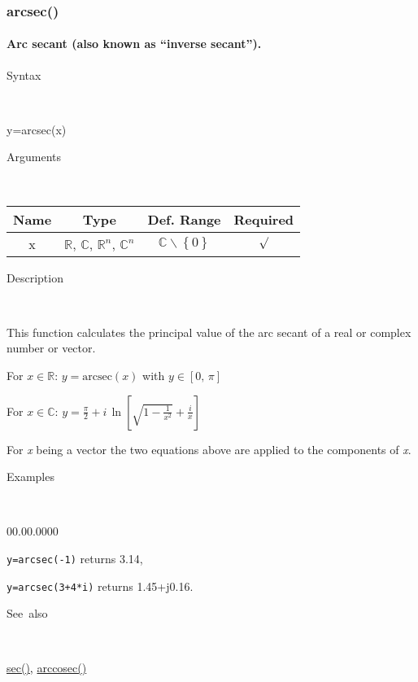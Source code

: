 \newpage
\subsubsection*{\hypertarget{arcsec}{}{\Large arcsec()}}


\paragraph{\label{par:Arc-sec}Arc secant (also known as {}``inverse secant'').}

\begin{description}
\item [Syntax]~
\end{description}
y=arcsec(x)

\begin{description}
\item [Arguments]~
\end{description}
\begin{tabular}{|c|c|c|c|}
\hline 
Name&
Type&
Def. Range&
Required\tabularnewline
\hline
\hline 
x&
$\mathbb{R}$, $\mathbb{C}$, $\mathbb{R}^{n}$, $\mathbb{C}^{n}$&
$\mathbb{C}\backslash \left\lbrace 0\right\rbrace $&
$\surd$\tabularnewline
\hline
\end{tabular}

\begin{description}
\item [Description]~
\end{description}
This function calculates the principal value of the arc secant of a
real or complex number or vector.

\medskip{}
For $x\in\mathbb{R}$: $y=\textrm{arcsec}\left( x\right) $ with $y\in\left[ 0,\,\pi\right] $

\medskip{}
For $x\in\mathbb{C}$: $y=\frac{\pi}{2}+i\,\ln\left[\sqrt{1-\frac{1}{x^{2}}}+\frac{i}{x}\right]$
\medskip{}

For \textit{x} being a vector the two equations above are
applied to the components of \textit{x}.

\begin{description}
\item [Examples]~
\end{description}
\begin{lyxlist}{00.00.0000}
\item [\texttt{y=arcsec(-1)}]returns 3.14,
\item [\texttt{y=arcsec(3+4{*}i)}]returns 1.45+j0.16.
\end{lyxlist}
\begin{description}
\item [See~also]~
\end{description}
\textcolor{blue}{\hyperlink{sec}{sec()}}\textcolor{black}{,} \textcolor{blue}{\hyperlink{arccosec}{arccosec()}}

